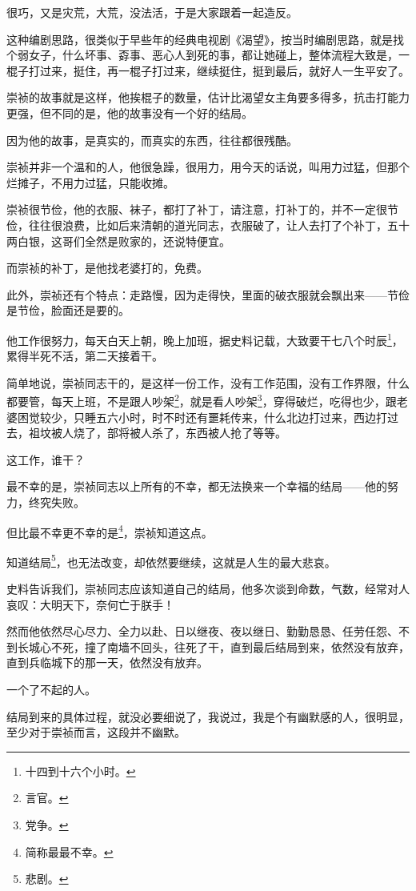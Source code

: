 \begin{multicols}{\theparacolNo}
		很巧，又是灾荒，大荒，没法活，于是大家跟着一起造反。

		这种编剧思路，很类似于早些年的经典电视剧《渴望》，按当时编剧思路，就是找个弱女子，什么坏事、孬事、恶心人到死的事，都让她碰上，整体流程大致是，一棍子打过来，挺住，再一棍子打过来，继续挺住，挺到最后，就好人一生平安了。

		崇祯的故事就是这样，他挨棍子的数量，估计比渴望女主角要多得多，抗击打能力更强，但不同的是，他的故事没有一个好的结局。

		因为他的故事，是真实的，而真实的东西，往往都很残酷。

		崇祯并非一个温和的人，他很急躁，很用力，用今天的话说，叫用力过猛，但那个烂摊子，不用力过猛，只能收摊。

		崇祯很节俭，他的衣服、袜子，都打了补丁，请注意，打补丁的，并不一定很节俭，往往很浪费，比如后来清朝的道光同志，衣服破了，让人去打了个补丁，五十两白银，这哥们全然是败家的，还说特便宜。

		而崇祯的补丁，是他找老婆打的，免费。

		此外，崇祯还有个特点：走路慢，因为走得快，里面的破衣服就会飘出来——节俭是节俭，脸面还是要的。

		他工作很努力，每天白天上朝，晚上加班，据史料记载，大致要干七八个时辰\footnote{十四到十六个小时。}，累得半死不活，第二天接着干。

		简单地说，崇祯同志干的，是这样一份工作，没有工作范围，没有工作界限，什么都要管，每天上班，不是跟人吵架\footnote{言官。}，就是看人吵架\footnote{党争。}，穿得破烂，吃得也少，跟老婆困觉较少，只睡五六小时，时不时还有噩耗传来，什么北边打过来，西边打过去，祖坟被人烧了，部将被人杀了，东西被人抢了等等。

		这工作，谁干？

		最不幸的是，崇祯同志以上所有的不幸，都无法换来一个幸福的结局——他的努力，终究失败。

		但比最不幸更不幸的是\footnote{简称最最不幸。}，崇祯知道这点。

		知道结局\footnote{悲剧。}，也无法改变，却依然要继续，这就是人生的最大悲哀。

		史料告诉我们，崇祯同志应该知道自己的结局，他多次谈到命数，气数，经常对人哀叹：大明天下，奈何亡于朕手！

		然而他依然尽心尽力、全力以赴、日以继夜、夜以继日、勤勤恳恳、任劳任怨、不到长城心不死，撞了南墙不回头，往死了干，直到最后结局到来，依然没有放弃，直到兵临城下的那一天，依然没有放弃。

		一个了不起的人。

		结局到来的具体过程，就没必要细说了，我说过，我是个有幽默感的人，很明显，至少对于崇祯而言，这段并不幽默。


\end{multicols}
